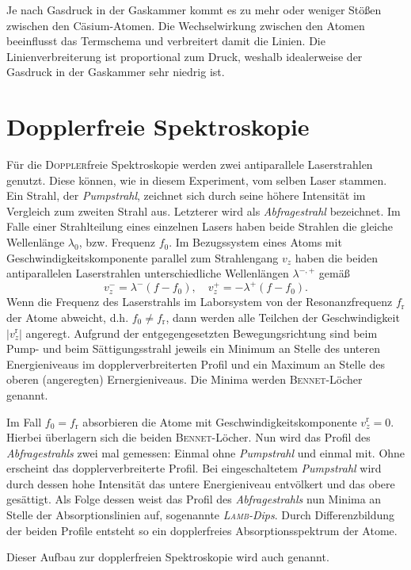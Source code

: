 \documentclass[../bericht.tex]{subfiles}
\begin{document}
        Je nach Gasdruck in der Gaskammer kommt es zu mehr oder weniger Stößen zwischen den Cäsium-Atomen. Die Wechselwirkung zwischen den Atomen beeinflusst das Termschema und verbreitert damit die Linien. Die Linienverbreiterung ist proportional zum Druck, weshalb idealerweise der Gasdruck in der Gaskammer sehr niedrig ist.


    \section{Dopplerfreie Spektroskopie}

      Für die \textsc{Doppler}freie Spektroskopie werden zwei antiparallele Laserstrahlen genutzt. Diese können, wie in diesem Experiment, vom selben Laser stammen. Ein Strahl, der \textit{Pumpstrahl}, zeichnet sich durch seine höhere Intensität im Vergleich zum zweiten Strahl aus. Letzterer wird als \textit{Abfragestrahl} bezeichnet.
      Im Falle einer Strahlteilung eines einzelnen Lasers haben beide Strahlen die gleiche Wellenlänge $\lambda_0$, bzw. Frequenz $f_0$. Im Bezugssystem eines Atoms mit Geschwindigkeitskomponente parallel zum Strahlengang $v_z$ haben die beiden antiparallelen Laserstrahlen unterschiedliche Wellenlängen $\lambda ^{-,+}$ gemäß
      \begin{equation*}
        v_z^-=\lambda^- (f-f_0),\quad v_z^+=-\lambda^+ (f-f_0).
      \end{equation*}
      \medskip
      Wenn die Frequenz des Laserstrahls im Laborsystem von der Resonanzfrequenz $f_\mathrm{r}$ der Atome abweicht, d.h. $f_0\ne f_\mathrm{r}$, dann werden alle Teilchen der Geschwindigkeit $|v_z^\mathrm{r}|$ angeregt. Aufgrund der entgegengesetzten Bewegungsrichtung sind beim Pump- und beim Sättigungsstrahl jeweils ein Minimum an Stelle des unteren Energieniveaus im dopplerverbreiterten Profil und ein Maximum an Stelle des oberen (angeregten) Ernergieniveaus. Die Minima werden \textsc{Bennet}-Löcher genannt.
      \medskip

      Im Fall $f_0 = f_\mathrm{r}$ absorbieren die Atome mit Geschwindigkeitskomponente $v_z^\mathrm{r} = 0$. Hierbei überlagern sich die beiden \textsc{Bennet}-Löcher. Nun wird das Profil des \textit{Abfragestrahls} zwei mal gemessen: Einmal ohne \textit{Pumpstrahl} und einmal mit. Ohne erscheint das dopplerverbreiterte Profil. Bei eingeschaltetem \textit{Pumpstrahl} wird durch dessen hohe Intensität das untere Energieniveau entvölkert und das obere gesättigt. Als Folge dessen weist das Profil des \textit{Abfragestrahls} nun Minima an Stelle der Absorptionslinien auf, sogenannte \textit{\textsc{Lamb}-Dips}. Durch Differenzbildung der beiden Profile entsteht so ein dopplerfreies Absorptionsspektrum der Atome.

      Dieser Aufbau zur dopplerfreien Spektroskopie wird auch  genannt.
\end{document}
